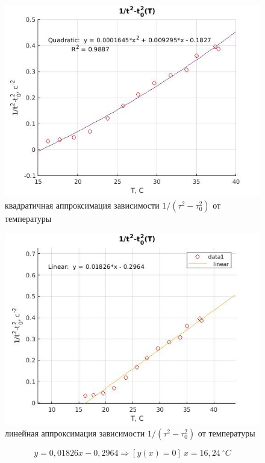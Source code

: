 \documentclass[a4paper, 12pt]{article}%
\begin{document}
\begin{figure}[h!]
    \centering
	\includegraphics[scale = 0.5]{g1.jpg}
    \caption{квадратичная аппроксимация зависимости $1 /\left(\tau^{2}-\tau_{0}^{2}\right)$ от температуры }
    \label{scheme}
\end{figure}

\begin{figure}[h!]
    \centering
	\includegraphics[scale = 0.5]{linAppr.jpg}
    \caption{линейная аппроксимация зависимости $1 /\left(\tau^{2}-\tau_{0}^{2}\right)$ от температуры }
    \label{scheme}
\end{figure}

\[ y = 0,01826x - 0,2964 \Rightarrow [y(x) = 0]\ x = 16,24\ ^{\circ} C \]
\end{document}
